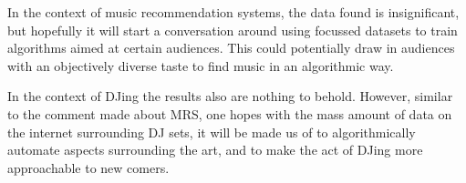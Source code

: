 In the context of music recommendation systems, the data found is insignificant, but hopefully it will start a conversation around using focussed datasets to train algorithms aimed at certain audiences. This could potentially draw in audiences with an objectively diverse taste to find music in an algorithmic way.

In the context of DJing the results also are nothing to behold. However, similar to the comment made about MRS, one hopes with the mass amount of data on the internet surrounding DJ sets, it will be made us of to algorithmically automate aspects surrounding the art, and to make the act of DJing more approachable to new comers. 

